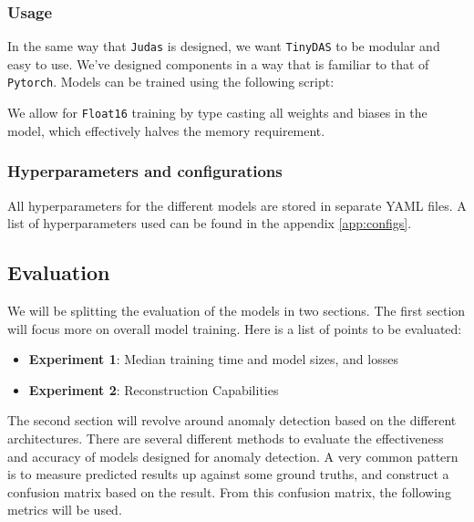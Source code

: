 


\subsubsection{Usage}

In the same way that \texttt{Judas} is designed, we want \texttt{TinyDAS} to be modular and easy to use. We've designed components in a way that is familiar to that of \texttt{Pytorch}. Models can be trained using the following script:



We allow for \texttt{Float16} training by type casting all weights and biases in the model, which effectively halves the memory requirement.

\subsubsection{Hyperparameters and configurations}

All hyperparameters for the different models are stored in separate YAML files. A list of hyperparameters used can be found in the appendix \ref{app:configs}.

\subsection{Evaluation}

We will be splitting the evaluation of the models in two sections. The first section will focus more on overall model training. Here is a list of points to be evaluated: 

\begin{itemize}
    \item \textbf{Experiment 1}: Median training time and model sizes, and losses
    \item \textbf{Experiment 2}: Reconstruction Capabilities
\end{itemize}

The second section will revolve around anomaly detection based on the different architectures. There are several different methods to evaluate the effectiveness and accuracy of models designed for anomaly detection. A very common pattern is to measure predicted results up against some ground truths, and construct a confusion matrix based on the result. From this confusion matrix, the following metrics will be used. \\ 

